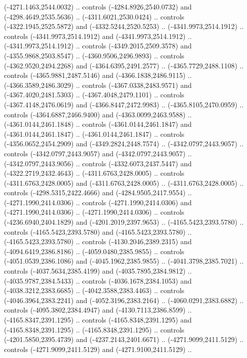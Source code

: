 \begin{scope}[shift={(430.80877,-416.69739)}]
\begin{scope}[shift={(4537.8125,-1856.4436)}]
\begin{scope}[shift={(-148.39113,-28.14259)}]
        (-4271.1463,2544.0032) .. controls (-4284.8926,2540.0732) and
        (-4298.4649,2535.5636) .. (-4311.6021,2530.0424) .. controls
        (-4322.1945,2525.5872) and (-4332.5244,2520.5253) .. (-4341.9973,2514.1912) ..
        controls (-4341.9973,2514.1912) and (-4341.9973,2514.1912) ..
        (-4341.9973,2514.1912) .. controls (-4349.2015,2509.3578) and
        (-4355.9868,2503.8547) .. (-4360.9506,2496.9893) .. controls
        (-4362.9520,2494.2268) and (-4364.6395,2491.2577) .. (-4365.7729,2488.1108) ..
        controls (-4365.9881,2487.5146) and (-4366.1838,2486.9115) ..
        (-4366.3589,2486.3029) .. controls (-4367.0338,2483.9571) and
        (-4367.4020,2481.5303) .. (-4367.4048,2479.1101) .. controls
        (-4367.4148,2476.0619) and (-4366.8447,2472.9983) .. (-4365.8105,2470.0959) ..
        controls (-4364.6887,2466.9400) and (-4363.0099,2463.9588) ..
        (-4361.0144,2461.1848) .. controls (-4361.0144,2461.1847) and
        (-4361.0144,2461.1847) .. (-4361.0144,2461.1847) .. controls
        (-4356.0652,2454.2909) and (-4349.2824,2448.7574) .. (-4342.0797,2443.9057) ..
        controls (-4342.0797,2443.9057) and (-4342.0797,2443.9057) ..
        (-4342.0797,2443.9056) .. controls (-4332.6073,2437.5447) and
        (-4322.2719,2432.4643) .. (-4311.6763,2428.0005) .. controls
        (-4311.6763,2428.0005) and (-4311.6763,2428.0005) .. (-4311.6763,2428.0005) ..
        controls (-4298.5315,2422.4666) and (-4284.9505,2417.9554) ..
        (-4271.1990,2414.0306) .. controls (-4271.1990,2414.0306) and
        (-4271.1990,2414.0306) .. (-4271.1990,2414.0306) .. controls
        (-4236.6940,2404.1829) and (-4201.2019,2397.9653) .. (-4165.5423,2393.5780) ..
        controls (-4165.5423,2393.5780) and (-4165.5423,2393.5780) ..
        (-4165.5423,2393.5780) .. controls (-4130.2046,2389.2315) and
        (-4094.6419,2386.8186) .. (-4059.0480,2385.9855) .. controls
        (-4051.0539,2386.1086) and (-4045.1962,2385.9855) .. (-4041.3798,2385.7021) ..
        controls (-4037.5634,2385.4199) and (-4035.7895,2384.9812) ..
        (-4035.9787,2384.5433) .. controls (-4036.1678,2384.1053) and
        (-4038.3212,2383.6685) .. (-4042.3588,2383.4463) .. controls
        (-4046.3964,2383.2241) and (-4052.3196,2383.2164) .. (-4060.0291,2383.6882) ..
        controls (-4095.3802,2384.4947) and (-4130.7113,2386.8599) ..
        (-4165.8347,2391.1295) .. controls (-4165.8348,2391.1295) and
        (-4165.8348,2391.1295) .. (-4165.8348,2391.1295) .. controls
        (-4201.5850,2395.4739) and (-4237.2143,2401.6671) .. (-4271.9099,2411.5129) ..
        controls (-4271.9099,2411.5129) and (-4271.9100,2411.5129) ..

\end{scope}
\end{scope}
\end{scope}
